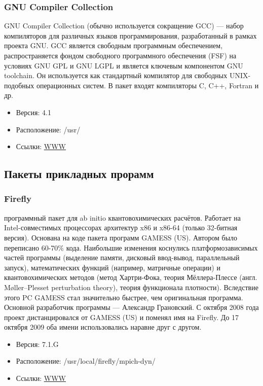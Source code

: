 \documentclass[a4paper,8pt]{extreport}
\begin{document}
\subsubsection{GNU Compiler Collection}
GNU Compiler Collection (обычно используется сокращение GCC) — набор компиляторов для различных языков 
программирования, разработанный в рамках проекта GNU. GCC является свободным программным обеспечением, 
распространяется фондом свободного программного обеспечения (FSF) на условиях GNU GPL и GNU LGPL и является 
ключевым компонентом GNU toolchain. Он используется как стандартный компилятор для свободных UNIX-подобных 
операционных систем.
В пакет входят компиляторы C, C++, Fortran и др.
\begin{itemize}
 \item Версия: 4.1
 \item Расположение: /usr/
 \item Ссылки: \href{http://gcc.gnu.org/}{WWW}
\end{itemize}

\subsection{Пакеты прикладных прорамм}
\subsubsection{Firefly}
программный пакет для ab initio квантовохимических расчётов. Работает на Intel-совместимых процессорах 
архитектур x86 и x86-64 (только 32-битная версия). Основана на коде пакета программ GAMESS (US). Автором 
было переписано 60-70\% кода. Наибольшие изменения коснулись платформозависимых частей программы 
(выделение памяти, дисковый ввод-вывод, параллельный запуск), математических функций (например, 
матричные операции) и квантовохимических методов (метод Хартри-Фока, теория Мёллера-Плессе 
(англ. Møller–Plesset perturbation theory), теория функционала плотности). Вследствие этого PC GAMESS 
стал значительно быстрее, чем оригинальная программа. Основной разработчик программы — Александр Грановский.
С октября 2008 года проект дистанцировался от GAMESS (US) и поменял имя на Firefly. До 17 октября 2009 оба
имени использовались наравне друг с другом.
\begin{itemize}
 \item Версия: 7.1.G
 \item Расположение: /usr/local/firefly/mpich-dyn/
 \item Ссылки: \href{http://classic.chem.msu.su/gran/gamess/}{WWW}
\end{itemize}
\end{document}
